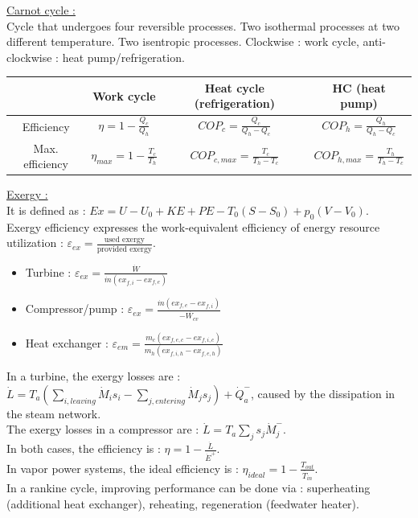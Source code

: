 \documentclass[../main.tex]{subfiles}
\begin{document}
\quad \underline{Carnot cycle :}\\
Cycle that undergoes four reversible processes. Two isothermal processes at two different temperature. Two isentropic processes. Clockwise : work cycle, anti-clockwise : heat pump/refrigeration.\\
\begin{table}[hbt!]
    \centering
    \begin{tabular}{c|c|c|c}
     & Work cycle & Heat cycle (refrigeration) & HC (heat pump)\\ \hline
    Efficiency & $\eta = 1-\frac{Q_c}{Q_h}$ & $COP_c = \frac{Q_c}{Q_h-Q_c}$ & $COP_h = \frac{Q_h}{Q_h-Q_c}$ \\ \hline
    Max. efficiency & $\eta_{max} = 1-\frac{T_c}{T_h}$ & $COP_{c,max} = \frac{T_c}{T_h-T_c}$ & $COP_{h,max} = \frac{T_h}{T_h-T_c}$\\
    \end{tabular}
\end{table}

\quad \underline{Exergy :}\\
It is defined as : $Ex = U-U_0 + KE + PE - T_0(S-S_0) + p_0(V-V_0)$.\\
Exergy efficiency expresses the work-equivalent efficiency of energy resource utilization : $\varepsilon_{ex} = \frac{\text{used exergy}}{\text{provided exergy}}$.\\
\begin{itemize}
    \item Turbine : $\varepsilon_{ex} = \frac{\dot{W}}{\dot{m}(ex_{f,i} - ex_{f,e})}$
    \item Compressor/pump : $\varepsilon_{ex} = \frac{\dot{m}(ex_{f,e} - ex_{f,i})}{-\dot{W_{cv}}}$
    \item Heat exchanger : $\varepsilon_{em} = \frac{m_c (ex_{f,e,c} - ex_{f,i,c})}{m_h (ex_{f,i,h} - ex_{f,e,h})}$
\end{itemize}

In a turbine, the exergy losses are : $\dot{L} = T_a(\sum_{i, leaving} \dot{M}_is_i - \sum_{j, entering} \dot{M}_j s_j) + \dot{Q}_a^-$, caused by the dissipation in the steam network. \\
The exergy losses in a compressor are : $\dot{L} = T_a \sum_j s_j \dot{M}_j^-$.\\
In both cases, the efficiency is : $\eta=1-\frac{\dot{L}}{\dot{E}^+}$.\\

In vapor power systems, the ideal efficiency is : $\eta_{ideal}= 1-\frac{T_{out}}{\overline{T}_{in}}$.\\
In a rankine cycle, improving performance can be done via : superheating (additional heat exchanger), reheating, regeneration (feedwater heater).\\
\end{document}
